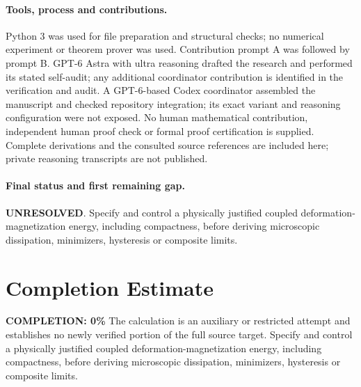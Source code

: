\documentclass[11pt]{article}
\begin{document}
\paragraph{Tools, process and contributions.}
Python 3 was used for file preparation and structural checks; no numerical experiment or theorem prover was used. Contribution prompt A was followed by prompt B. GPT-6 Astra with ultra reasoning drafted the research and performed its stated self-audit; any additional coordinator contribution is identified in the verification and audit. A GPT-6-based Codex coordinator assembled the manuscript and checked repository integration; its exact variant and reasoning configuration were not exposed. No human mathematical contribution, independent human proof check or formal proof certification is supplied. Complete derivations and the consulted source references are included here; private reasoning transcripts are not published.

\paragraph{Final status and first remaining gap.}
\textbf{UNRESOLVED}. Specify and control a physically justified coupled deformation-magnetization energy, including compactness, before deriving microscopic dissipation, minimizers, hysteresis or composite limits.

\section{Completion Estimate}
\noindent\textbf{COMPLETION: 0\%}
The calculation is an auxiliary or restricted attempt and establishes no newly verified portion of the full source target. Specify and control a physically justified coupled deformation-magnetization energy, including compactness, before deriving microscopic dissipation, minimizers, hysteresis or composite limits.
\end{document}
